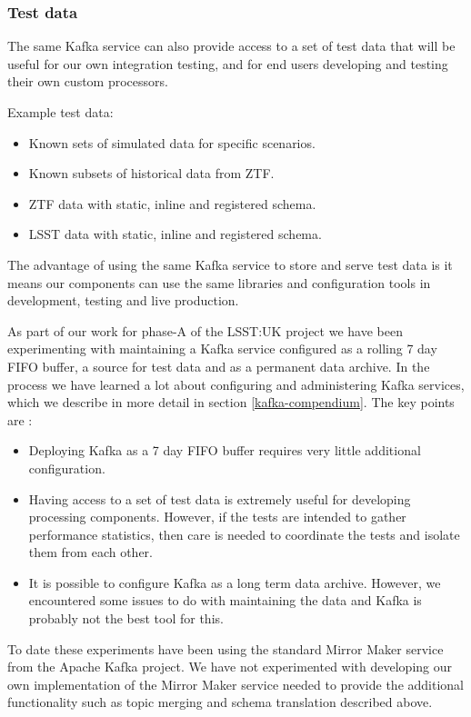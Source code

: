 \documentclass{article}
\newcommand{\kafka} {Kafka\xspace}
\newcommand{\apachekafka} {Apache Kafka\xspace}
\newcommand{\mirrormaker} {Mirror Maker\xspace}
\newcommand{\phasea} {phase-A\xspace}
\newcommand{\ztf} {ZTF\xspace}
\newcommand{\lsst} {LSST\xspace}
\newcommand{\lsstuk} {LSST:UK\xspace}
\begin{document}
\subsubsection{Test data}
\label{stage-1.test-data}
The same \kafka service can also provide access to a set of test data that will be useful for our own integration testing, and for end users developing and testing their own custom processors.

Example test data:
\begin{itemize}
  \item Known sets of simulated data for specific scenarios.
  \item Known subsets of historical data from \ztf.
  \item \ztf data with static, inline and registered schema.
  \item \lsst data with static, inline and registered schema.
\end{itemize}

The advantage of using the same \kafka service to store and serve test data is it means our components can use the same libraries and configuration tools in development, testing and live production.

As part of our work for \phasea of the \lsstuk project we have been experimenting with maintaining a \kafka service configured as a rolling 7 day FIFO buffer, a source for test data and as a permanent data archive.
In the process we have learned a lot about configuring and administering \kafka services, which we describe in more detail in section \ref{kafka-compendium}.
The key points are :
\begin{itemize}
    \item Deploying \kafka as a 7 day FIFO buffer requires very little additional configuration.
    \item Having access to a set of test data is extremely useful for developing processing components. However, if the tests are intended to gather performance statistics, then care is needed to coordinate the tests and isolate them from each other.
    \item It is possible to configure \kafka as a long term data archive. However, we encountered some issues to do with maintaining the data and \kafka is probably not the best tool for this. 
\end{itemize}

To date these experiments have been using the standard \mirrormaker service from the \apachekafka project.
We have not experimented with developing our own implementation of the \mirrormaker service needed to provide the additional functionality such as topic merging and schema translation described above.
\end{document}
